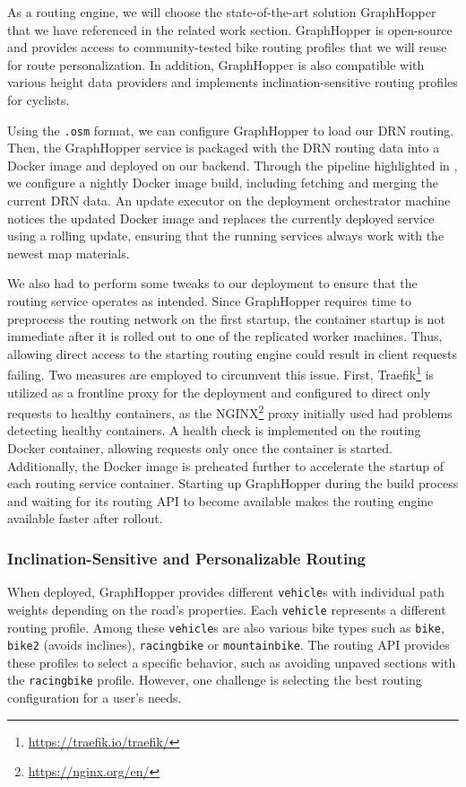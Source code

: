 As a routing engine, we will choose the state-of-the-art solution GraphHopper that we have referenced in the related work section. GraphHopper is open-source and provides access to community-tested bike routing profiles that we will reuse for route personalization. In addition, GraphHopper is also compatible with various height data providers and implements inclination-sensitive routing profiles for cyclists. 

Using the \texttt{.osm} format, we can configure GraphHopper to load our DRN routing. Then, the GraphHopper service is packaged with the DRN routing data into a Docker image and deployed on our backend. Through the pipeline highlighted in , we configure a nightly Docker image build, including fetching and merging the current DRN data. An update executor on the deployment orchestrator machine notices the updated Docker image and replaces the currently deployed service using a rolling update, ensuring that the running services always work with the newest map materials. 

We also had to perform some tweaks to our deployment to ensure that the routing service operates as intended. Since GraphHopper requires time to preprocess the routing network on the first startup, the container startup is not immediate after it is rolled out to one of the replicated worker machines. Thus, allowing direct access to the starting routing engine could result in client requests failing. Two measures are employed to circumvent this issue. First, Traefik\footnote{\url{https://traefik.io/traefik/}} is utilized as a frontline proxy for the deployment and configured to direct only requests to healthy containers, as the NGINX\footnote{\url{https://nginx.org/en/}} proxy initially used had problems detecting healthy containers. A health check is implemented on the routing Docker container, allowing requests only once the container is started. Additionally, the Docker image is preheated further to accelerate the startup of each routing service container. Starting up GraphHopper during the build process and waiting for its routing API to become available makes the routing engine available faster after rollout.

\subsubsection{Inclination-Sensitive and Personalizable Routing}\label{sec:maxlorenz3}

When deployed, GraphHopper provides different \texttt{vehicle}s with individual path weights depending on the road's properties. Each \texttt{vehicle} represents a different routing profile. Among these \texttt{vehicle}s are also various bike types such as \texttt{bike}, \texttt{bike2} (avoids inclines), \texttt{racingbike} or \texttt{mountainbike}. The routing API provides these profiles to select a specific behavior, such as avoiding unpaved sections with the \texttt{racingbike} profile. However, one challenge is selecting the best routing configuration for a user's needs. 

